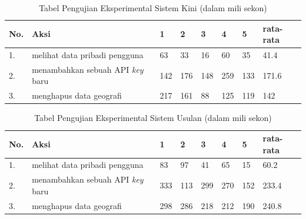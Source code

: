 \begin{table}[H]
	\centering
	\caption{Tabel Pengujian Eksperimental Sistem Kini (dalam mili sekon)}
		\begin{tabular}{|p{0.25cm}| p{7cm}| p{1cm}| p{1cm}| p{1cm}| p{1cm}| p{1cm}| p{1cm}|} \hline
		No. & Aksi & 1 & 2 & 3 & 4 & 5 & rata-rata \\ \hline
		1. & melihat data pribadi pengguna & 63 & 33 & 16 & 60 & 35 & 41.4 \\ \hline
		2. & menambahkan sebuah API \textit{key} baru & 142 & 176 & 148 & 259 & 133 & 171.6 \\ \hline
		3. & menghapus data geografi & 217 & 161 & 88 & 125 & 119 &  142\\ \hline
		\end{tabular}
	\label{table:hasileksperimental1}
\end{table}

\begin{table}[H]
	\centering
	\caption{Tabel Pengujian Eksperimental Sistem Usulan (dalam mili sekon)}
		\begin{tabular}{|p{0.25cm}| p{7cm}| p{1cm}| p{1cm}| p{1cm}| p{1cm}| p{1cm}| p{1cm}|} \hline
		No. & Aksi & 1 & 2 & 3 & 4 & 5 & rata-rata \\ \hline
		1. & melihat data pribadi pengguna & 83 & 97 & 41 & 65 & 15 & 60.2 \\ \hline
		2. & menambahkan sebuah API \textit{key} baru & 333 & 113 & 299 & 270 & 152 & 233.4 \\ \hline
		3. & menghapus data geografi & 298 & 286 & 218 & 212 & 190 & 240.8 \\ \hline
		\end{tabular}
	\label{table:hasileksperimental2}
\end{table}